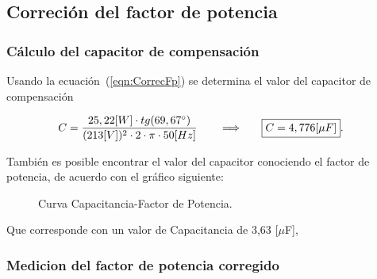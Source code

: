   \subsection{Correción del factor de potencia}
    \subsubsection{Cálculo del capacitor de compensación}
      
       Usando la ecuación~(\ref{eqn:CorrecFp}) se determina el valor del capacitor de compensación

      \begin{align*}
        C = \frac{25,22 [W] \cdot tg(69,67 ^{\circ} )}{(213[V])^2 \cdot 2 \cdot \pi \cdot 50[Hz] }  \hspace{20pt} \Longrightarrow \hspace{20pt} \Aboxed{C = 4,776 [ \mu F]}.
      \end{align*}

        También es posible encontrar el valor del capacitor conociendo el factor de potencia, de acuerdo
        con el gráfico siguiente:

        \begin{figure}[H]
          \centering
            \caption{Curva Capacitancia-Factor de Potencia.}
            \label{fig: Curva Cap_FDP}
        \end{figure}

        Que corresponde con un valor de Capacitancia de 3,63 [$\mu$F], 

    \subsubsection{Medicion del factor de potencia corregido}

